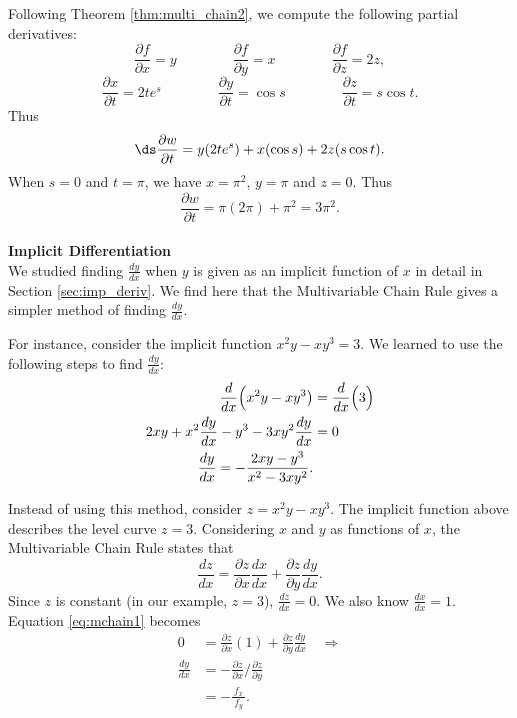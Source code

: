 {Following Theorem \ref{thm:multi_chain2}, we compute the following partial derivatives:
$$\frac{\partial f}{\partial x} = y\qquad\qquad \frac{\partial f}{\partial y} = x\qquad\qquad \frac{\partial f}{\partial z} = 2z,$$
$$\frac{\partial x}{\partial t} = 2te^s\qquad\qquad \frac{\partial y}{\partial t} = \cos s\qquad\qquad \frac{\partial z}{\partial t} = s\cos t.$$
Thus $$\ds \frac{\partial w}{\partial t} = y(2te^s) + x(\cos s) + 2z(s\cos t).$$ 
When $s=0$ and $t=\pi$, we have $x=\pi^2$, $y=\pi$ and $z=0$. Thus
$$\frac{\partial w}{\partial t} = \pi(2\pi) + \pi^2 = 3\pi^2.$$
\baselineskip
}\\

\noindent\textbf{\large Implicit Differentiation}\\

We studied finding $\frac{dy}{dx}$ when $y$ is given as an implicit function of $x$ in detail in Section \ref{sec:imp_deriv}. We find here that the Multivariable Chain Rule gives a simpler method of finding $\frac{dy}{dx}$.

For instance, consider the implicit function $x^2y-xy^3=3.$ We learned to use the following steps to find $\frac{dy}{dx}$:
\begin{align}
\frac{d}{dx}\Big(x^2y-xy^3\big) &= \frac{d}{dx}\Big(3\Big) \notag\\
2xy + x^2\frac{dy}{dx}-y^3-3xy^2\frac{dy}{dx} &= 0\notag \\
\frac{dy}{dx} = -\frac{2xy-y^3}{x^2-3xy^2}.\label{eq:mchain2}
\end{align}

Instead of using this method, consider $z=x^2y-xy^3$. The implicit function above describes the level curve $z=3$. Considering $x$ and $y$ as functions of $x$, the Multivariable Chain Rule states that
\begin{equation}\frac{dz}{dx} = \frac{\partial z}{\partial x}\frac{dx}{dx}+\frac{\partial z}{\partial y}\frac{dy}{dx}.\label{eq:mchain1}\end{equation}
Since $z$ is constant (in our example, $z=3$), $\frac{dz}{dx} = 0$. We also know $\frac{dx}{dx} = 1$. Equation \eqref{eq:mchain1} becomes
\begin{align*}
0 &= \frac{\partial z}{\partial x}(1) + \frac{\partial z}{\partial y}\frac{dy}{dx} \quad \Rightarrow\\[5pt]
\frac{dy}{dx} &= -\frac{\partial z}{\partial x}\Big/\frac{\partial z}{\partial y}\\[5pt]
			&= -\frac{\,f_x\,}{f_y}.
\end{align*}

